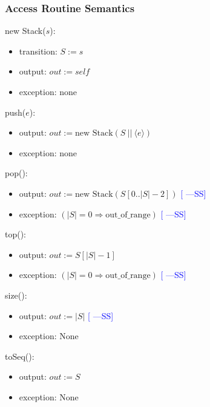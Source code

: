 \documentclass[12pt]{article}
\newcommand{\authornote}[3]{\textcolor{#1}{[#3 ---#2]}}
\newcommand{\authornote}[3]{}
\newcommand{\wss}[1]{\authornote{blue}{SS}{#1}}
\begin{document}
\subsubsection* {Access Routine Semantics}

new Stack($s$):
\begin{itemize}
\item transition: $S := s$

\item output: $\mathit{out} := \mathit{self}$
\item exception: none
\end{itemize}

\noindent push($e$):
\begin{itemize}
\item output: $out := \text{new Stack}(S\ ||\ \langle e \rangle)$
\item exception: none
\end{itemize}

\noindent pop():
\begin{itemize}
\item output: $out := \text{new Stack}(S[0..|S| - 2])$ \wss{}

\item exception: $(|S| = 0 \Rightarrow \text{out\_of\_range})$ \wss{}

\end{itemize}

\noindent top():
\begin{itemize}
\item output: $\mathit{out} := S[|S| - 1]$

\item exception: $(|S| = 0 \Rightarrow \text{out\_of\_range})$ \wss{}

\end{itemize}

\noindent size():
\begin{itemize}
\item output: $\mathit{out} := |S|$ \wss{}
\item exception: None
\end{itemize}

\noindent toSeq():
\begin{itemize}
\item output: $\mathit{out} := S$
\item exception: None

\end{itemize}
\end{document}
